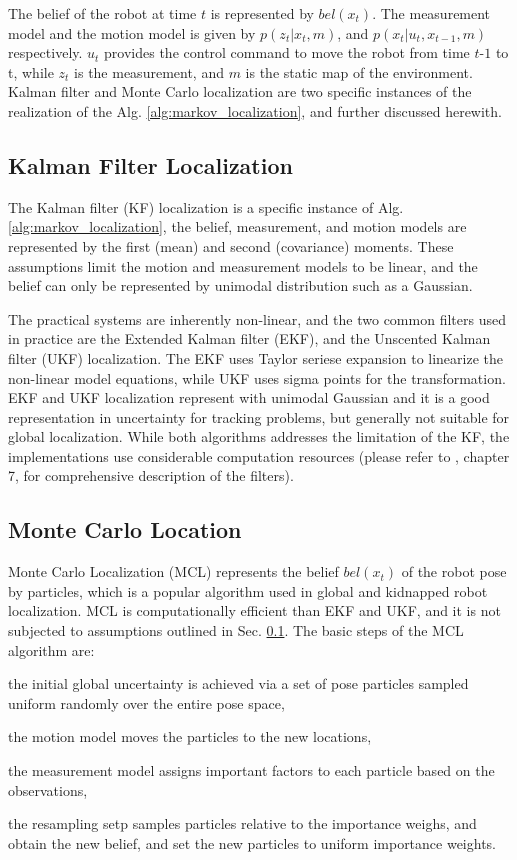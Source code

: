\documentclass[10pt,journal,compsoc]{IEEEtran}
\begin{document}
The belief of the robot at time $t$ is represented by $bel(x_t)$. The measurement model and the motion model is given by $p(z_t | x_t, m)$, and $p(x_t | u_t, x_{t-1}, m)$ respectively. $u_t$ provides the control command to move the robot from time $t$-$1$ to t, while $z_t$ is the measurement, and $m$ is the static map of the environment. Kalman filter and Monte Carlo localization are two specific instances of the realization of the Alg. \ref{alg:markov_localization}, and further discussed herewith.   

\subsection{Kalman Filter Localization}
\label{sub:kfl}

The Kalman filter (KF) localization is a specific instance of Alg. \ref{alg:markov_localization}, the belief, measurement, and motion models are represented by the first (mean) and second (covariance) moments.  These assumptions limit the motion and measurement models to be linear, and the belief can only be represented by unimodal distribution such as a Gaussian. 

The practical systems are inherently non-linear, and the two common filters used in practice are the Extended Kalman filter (EKF), and the Unscented Kalman filter (UKF) localization. The EKF uses Taylor seriese expansion to linearize the non-linear model equations, while UKF uses sigma points for the transformation.  EKF and UKF localization represent with unimodal Gaussian and it is a good representation in uncertainty  for tracking problems, but generally not suitable for global localization. While  both algorithms addresses the limitation of the KF, the implementations use considerable computation resources (please refer to \cite{Thrun:2005:PR:1121596}, chapter 7, for comprehensive description of the filters).   

\subsection{Monte Carlo Location}
\label{sub:mcl}

Monte Carlo Localization (MCL) represents the belief $bel(x_t)$ of the robot pose by particles, which is a popular algorithm used in global and kidnapped robot localization.  MCL is computationally efficient than EKF and UKF, and it is not subjected to assumptions outlined in Sec. \ref{sub:kfl}. The basic steps of the MCL algorithm are:   \begin{enumerate*} \item the initial global uncertainty is achieved via a set of pose particles sampled uniform randomly over the entire pose space, \item the motion model moves the particles to the new locations, \item the measurement model assigns important factors to each particle based on the observations, \item the resampling setp samples particles relative to the importance weighs, and obtain the new belief, and set the new particles to uniform importance weights.  \end{enumerate*}
\end{document}
